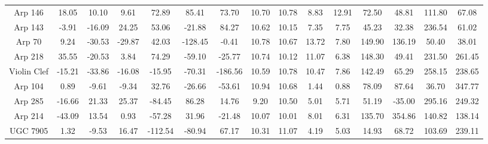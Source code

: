 \begin{table}
{\begin{tabular}{|c|c|c|c|c|c|c|c|c|c|c|c|c|c|c|}
      Arp 146 &    18.05 &    10.10 &     9.61 &                72.89 &                85.41 &                73.70 &                          10.70 &                          10.78 &          8.83 &         12.91 &       72.50 &       48.81 &        111.80 &         67.08 \\
      Arp 143 &    -3.91 &   -16.09 &    24.25 &                53.06 &               -21.88 &                84.27 &                          10.62 &                          10.15 &          7.35 &          7.75 &       45.23 &       32.38 &        236.54 &         61.02 \\
       Arp 70 &     9.24 &   -30.53 &   -29.87 &                42.03 &              -128.45 &                -0.41 &                          10.78 &                          10.67 &         13.72 &          7.80 &      149.90 &      136.19 &         50.40 &         38.01 \\
      Arp 218 &    35.55 &   -20.53 &     3.84 &                74.29 &               -59.10 &               -25.77 &                          10.74 &                          10.12 &         11.07 &          6.38 &      148.30 &       49.41 &        231.50 &        261.45 \\
  Violin Clef &   -15.21 &   -33.86 &   -16.08 &               -15.95 &               -70.31 &              -186.56 &                          10.59 &                          10.78 &         10.47 &          7.86 &      142.49 &       65.29 &        258.15 &        238.65 \\
      Arp 104 &     0.89 &    -9.61 &    -9.34 &                32.76 &               -26.66 &               -53.61 &                          10.94 &                          10.68 &          1.44 &          0.88 &       78.09 &       87.64 &         36.70 &        347.77 \\
      Arp 285 &   -16.66 &    21.33 &    25.37 &               -84.45 &                86.28 &                14.76 &                           9.20 &                          10.50 &          5.01 &          5.71 &       51.19 &      -35.00 &        295.16 &        249.32 \\
      Arp 214 &   -43.09 &    13.54 &     0.93 &               -57.28 &                31.96 &               -21.48 &                          10.07 &                          10.01 &          8.01 &          6.31 &      135.70 &      354.86 &        140.82 &        138.14 \\
     UGC 7905 &     1.32 &    -9.53 &    16.47 &              -112.54 &               -80.94 &                67.17 &                          10.31 &                          11.07 &          4.19 &          5.03 &       14.93 &       68.72 &        103.69 &        239.11 \\

\end{tabular}}
\end{table}
